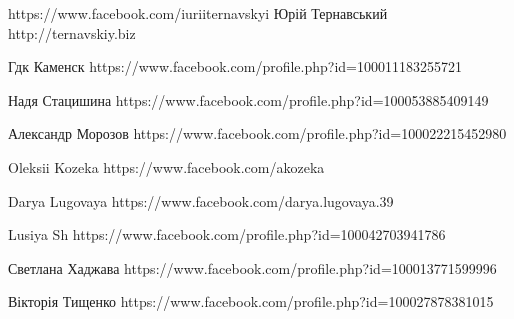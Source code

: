  
 
 
 
 

https://www.facebook.com/iuriiternavskyi
Юрій Тернавський
http://ternavskiy.biz






Гдк Каменск
https://www.facebook.com/profile.php?id=100011183255721

Надя Стацишина
https://www.facebook.com/profile.php?id=100053885409149

Александр Морозов
https://www.facebook.com/profile.php?id=100022215452980

Oleksii Kozeka
https://www.facebook.com/akozeka

Darya Lugovaya
https://www.facebook.com/darya.lugovaya.39

Lusiya Sh
https://www.facebook.com/profile.php?id=100042703941786

Светлана Хаджава
https://www.facebook.com/profile.php?id=100013771599996

Вікторія Тищенко
https://www.facebook.com/profile.php?id=100027878381015

